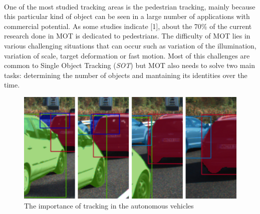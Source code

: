 \\
 One of the most studied tracking areas is the pedestrian tracking, mainly because this particular kind of object can be seen in a large number of applications with commercial potential. As some studies indicate [1], about the 70\% of the current research done in MOT is dedicated to pedestrians. The difficulty of MOT lies in various challenging situations that can occur such as variation of the illumination, variation of scale, target deformation or fast motion. Most of this challenges are common to Single Object Tracking (\textit{SOT}) but MOT also needs to solve two main tasks: determining the number of objects and mantaining its identities over the time.\\
\begin{figure}[H]
\begin{center}
\includegraphics[scale=0.4]{figures/adas_tracking.png}
\caption{The importance of tracking in the autonomous vehicles \cite{voigtlaender2019mots}}
\label{fig:adas_tracking}
\end{center}
\end{figure}
